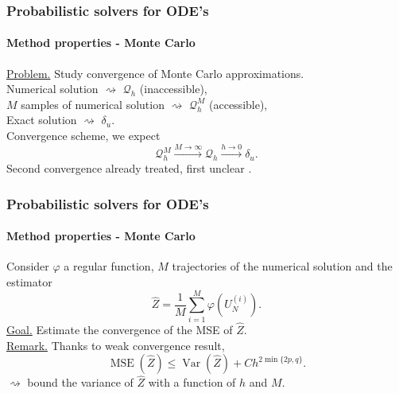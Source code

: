 \documentclass{beamer}
\newcommand{\MSE}{\operatorname{MSE}}
\newcommand{\Var}{\operatorname{Var}}
\renewcommand{\phi}{\varphi}
\begin{document}

\begin{frame}
	\frametitle{Probabilistic solvers for ODE's}
	\framesubtitle{Method properties - Monte Carlo}
	
	\underline{Problem.} Study convergence of Monte Carlo approximations. \\[0.5cm]
	Numerical solution $\rightsquigarrow$ $\mathcal Q_h$ (inaccessible), \\
	$M$ samples of numerical solution  $\rightsquigarrow$ $\mathcal Q_h^M$ (accessible), \\
	Exact solution $\rightsquigarrow$ $\delta_u$. \\[0.5cm]
	
	Convergence scheme, we expect
	\begin{equation*}
	\mathcal Q_h^M \xrightarrow{M\to \infty} \mathcal Q_h \xrightarrow{h\to 0} \delta_u.
	\end{equation*}
	Second convergence already treated, first unclear \cite{KeH16}.
\end{frame}

\begin{frame}
	\frametitle{Probabilistic solvers for ODE's}
	\framesubtitle{Method properties - Monte Carlo}
	
	Consider $\phi$ a regular function, $M$ trajectories of the numerical solution and the estimator
	\begin{equation*}
		\hat Z = \frac{1}{M} \sum_{i = 1}^M \phi\left(U_N^{(i)}\right).
	\end{equation*}
	\underline{Goal.} Estimate the convergence of the MSE of $\hat Z$. \\[0.5cm]
	\underline{Remark.} Thanks to weak convergence result,
	\begin{equation*}
		\MSE(\hat Z) \leq \Var(\hat Z) + C h^{2\min\{2p, q\}}.
	\end{equation*}
	$\rightsquigarrow$ bound the variance of $\hat Z$ with a function of $h$ and $M$.
\end{frame}
\end{document}
